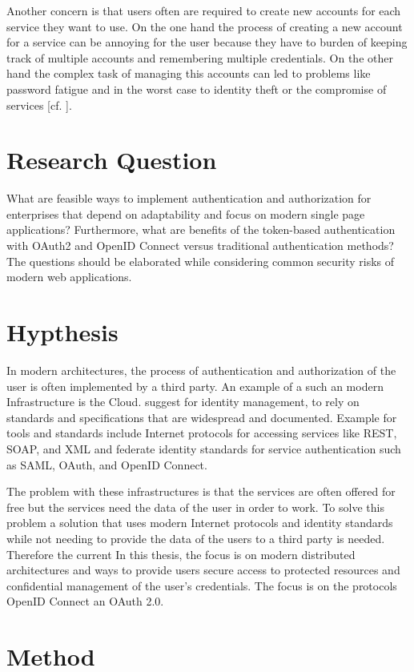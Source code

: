 Another concern is that users often are required to create new accounts for each service they want to use. On the one hand the process of creating a new account for a service can be annoying for the user because they have to burden of keeping track of multiple accounts and remembering multiple credentials. On the other hand the complex task of managing this accounts can led to problems like password fatigue and in the worst case to identity theft or the compromise of services [cf. \cite{Sakimura:OIDCC}].


\section{Research Question}
What are feasible ways to implement authentication and authorization for enterprises that depend on adaptability and focus on modern single page applications? Furthermore, what are benefits of the token-based authentication with OAuth2 and OpenID Connect versus traditional authentication methods? The questions should be elaborated while considering common security risks of modern web applications.

\section{Hypthesis}

In modern architectures, the process of authentication and authorization of the user is often implemented by a third party. An example of a such an modern Infrastructure is the Cloud. \cite{NIST:2017:DIG} suggest for identity management, to rely on standards and specifications that are widespread and documented. Example for tools and standards include Internet protocols for accessing services like REST, SOAP, and XML and federate identity standards for service authentication such as SAML, OAuth, and OpenID Connect.

The problem with these infrastructures is that the services are often offered for free but the services need the data of the user in order to work. To solve this problem a solution that uses modern Internet protocols and identity standards while not needing to provide the data of the users to a third party is needed. Therefore the current 
In this thesis, the focus is on modern distributed architectures and ways to provide users secure access to protected resources and confidential management of the user’s credentials. The focus is on the protocols OpenID Connect an OAuth 2.0. 


\section{Method}







\chapterend
